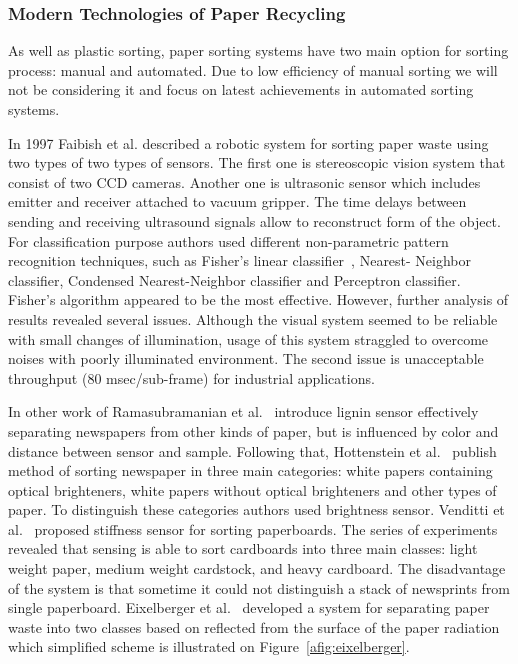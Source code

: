 \documentclass{lutmscthesis}[2010/09/22]
\begin{document}
\subsubsection*{ Modern Technologies of Paper Recycling }
As well as plastic sorting, paper
sorting systems have two main option for sorting process: manual
and automated. Due to low efficiency of manual sorting we will not be considering
it and focus on latest achievements in automated sorting systems.

In 1997 Faibish et al. \cite{Faibish:1997} described a robotic system for sorting paper waste
using two types of two types of sensors. The first one is stereoscopic
vision system that consist of two CCD cameras. Another one is ultrasonic
sensor which includes emitter and receiver attached to vacuum gripper.
The time delays between sending and receiving ultrasound signals allow
to reconstruct form of the object. For classification
purpose authors used different non-parametric pattern recognition
techniques, such as Fisher's linear classifier~\cite{Fisher:1936}, Nearest- Neighbor
classifier, Condensed Nearest-Neighbor classifier and
Perceptron classifier. Fisher's algorithm appeared to be the most effective.
However, further analysis of results revealed several issues. Although
the visual system seemed to be reliable with small changes
of illumination, usage of this system straggled to overcome
noises with poorly illuminated environment. The second issue
is unacceptable throughput (80 msec/sub-frame) for industrial applications.

In other work of Ramasubramanian et al.~\cite{Ramasubramanian:2005} introduce lignin sensor
effectively separating newspapers from other kinds of paper,
but is influenced by color and distance between sensor and sample.
Following that, Hottenstein et al.~\cite{Friberg:2000} publish method of sorting
newspaper in three main categories: white papers containing optical brighteners,
white papers without optical brighteners and other types of paper. To distinguish
these categories authors used brightness sensor. Venditti et al.~\cite{Venditti:2007}
proposed stiffness sensor for sorting paperboards. The series of
experiments revealed that sensing is able to sort cardboards
into three main classes: light weight paper, medium weight cardstock,
and heavy cardboard. The disadvantage
of the system is that sometime it could not distinguish a stack
of newsprints from single paperboard. Eixelberger et al.~\cite{Eixelberger:2003} developed a system
for separating paper waste into two classes based on reflected
from the surface of the paper radiation which simplified scheme
is illustrated on Figure~\ref{afig:eixelberger}.
\end{document}
